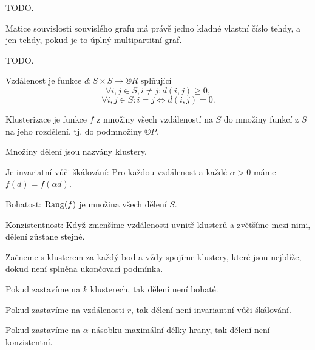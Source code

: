 \documentclass[12pt]{article}					%
\begin{document}
    \begin{tvrzeni}
        TODO.
    \end{tvrzeni}

    \begin{veta}[Petrovi\,c]
        Matice souvislosti souvislého grafu má právě jedno kladné vlastní číslo tehdy, a jen tehdy, pokud je to úplný multipartitní graf. 
    \end{veta}

    \begin{lemma}
        TODO.
    \end{lemma}

    \begin{definice}[Vzdálenost]
        Vzdálenost je funkce $d: S \times S \rightarrow ®R$ splňující
        $$ \forall i, j \in S, i ≠ j: d(i, j) ≥ 0, $$
        $$ \forall i, j \in S: i = j \Leftrightarrow d(i, j) = 0. $$ 
    \end{definice}

    \begin{definice}[Klustrizace]
        Klusterizace je funkce $f$ z množiny všech vzdáleností na $S$ do množiny funkcí z $S$ na jeho rozdělení, tj. do podmnožiny $©P$.

        Množiny dělení jsou nazvány klustery.
    \end{definice}

    \begin{definice}
        Je invariatní vůči škálování: Pro každou vzdálenost a každé $\alpha > 0$ máme $f(d) = f(\alpha d)$.

        Bohatost: $\operatorname{Rang}(f)$ je množina všech dělení $S$.

        Konzistentnost: Když zmenšíme vzdálenosti uvnitř klusterů a zvětšíme mezi nimi, dělení zůstane stejné.
    \end{definice}

    \begin{definice}
        Začneme s klusterem za každý bod a vždy spojíme klustery, které jsou nejblíže, dokud není splněna ukončovací podmínka.
    \end{definice}

    \begin{pozorovani}
        Pokud zastavíme na $k$ klusterech, tak dělení není bohaté.
        
        Pokud zastavíme na vzdálenosti $r$, tak dělení není invariantní vůči škálování.
        
        Pokud zastavíme na $\alpha$ násobku maximální délky hrany, tak dělení není konzistentní.
    \end{pozorovani}
\end{document}
